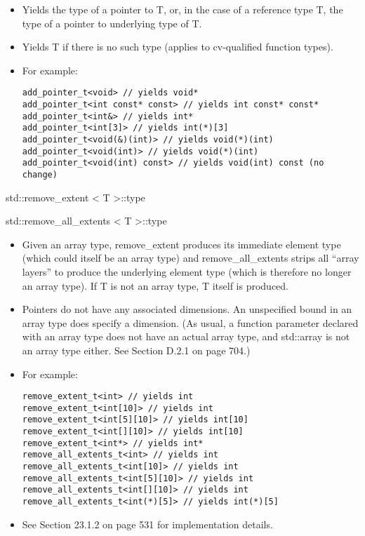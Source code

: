 \begin{itemize}
\item
Yields the type of a pointer to T, or, in the case of a reference type T, the type of a pointer to underlying type of T.

\item
Yields T if there is no such type (applies to cv-qualified function types).

\item
For example:
\begin{lstlisting}[style=styleCXX]
add_pointer_t<void> // yields void*
add_pointer_t<int const* const> // yields int const* const*
add_pointer_t<int&> // yields int*
add_pointer_t<int[3]> // yields int(*)[3]
add_pointer_t<void(&)(int)> // yields void(*)(int)
add_pointer_t<void(int)> // yields void(*)(int)
add_pointer_t<void(int) const> // yields void(int) const (no change)
\end{lstlisting}
\end{itemize}

std::remove\_extent < T >::type

std::remove\_all\_extents < T >::type

\begin{itemize}
\item
Given an array type, remove\_extent produces its immediate element type (which could itself be an array type) and remove\_all\_extents strips all “array layers” to produce the underlying element type (which is therefore no longer an array type). If T is not an array type, T itself is produced.

\item
Pointers do not have any associated dimensions. An unspecified bound in an array type does specify a dimension. (As usual, a function parameter declared with an array type does not have an actual array type, and std::array is not an array type either. See Section D.2.1 on page 704.)

\item
For example:
\begin{lstlisting}[style=styleCXX]
remove_extent_t<int> // yields int
remove_extent_t<int[10]> // yields int
remove_extent_t<int[5][10]> // yields int[10]
remove_extent_t<int[][10]> // yields int[10]
remove_extent_t<int*> // yields int*
remove_all_extents_t<int> // yields int
remove_all_extents_t<int[10]> // yields int
remove_all_extents_t<int[5][10]> // yields int
remove_all_extents_t<int[][10]> // yields int
remove_all_extents_t<int(*)[5]> // yields int(*)[5]
\end{lstlisting}

\item
See Section 23.1.2 on page 531 for implementation details.
\end{itemize}

